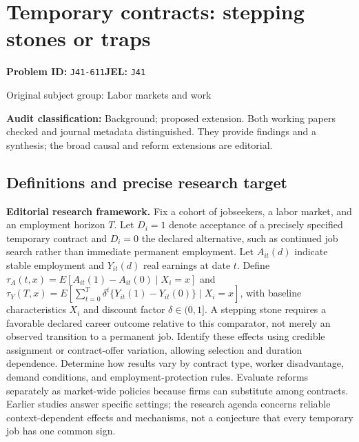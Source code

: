 \documentclass[11pt,a4paper]{article}
\begin{document}
\section*{Temporary contracts: stepping stones or traps}
\textbf{Problem ID:} \texttt{J41-611}\quad \textbf{JEL:} \texttt{J41}\par
\label{problem:OP-0359}
{\sffamily\small\color{muted}Original subject group: Labor markets and work\par}
\label{definitions:problem:30007641}
\textbf{Audit classification:} Background; proposed extension. Both working papers checked and journal metadata distinguished. They provide findings and a synthesis; the broad causal and reform extensions are editorial.
\subsection*{Definitions and precise research target}
\textbf{Editorial research framework.} Fix a cohort of jobseekers, a labor market, and an employment horizon \(T\). Let \(D_i=1\) denote acceptance of a precisely specified temporary contract and \(D_i=0\) the declared alternative, such as continued job search rather than immediate permanent employment. Let \(A_{it}(d)\) indicate stable employment and \(Y_{it}(d)\) real earnings at date \(t\). Define \(\tau_A(t,x)=E[A_{it}(1)-A_{it}(0)\mid X_i=x]\) and \(\tau_Y(T,x)=E[\sum_{t=0}^{T}\delta^t\{Y_{it}(1)-Y_{it}(0)\}\mid X_i=x]\), with baseline characteristics \(X_i\) and discount factor \(\delta\in(0,1]\). A stepping stone requires a favorable declared career outcome relative to this comparator, not merely an observed transition to a permanent job. Identify these effects using credible assignment or contract-offer variation, allowing selection and duration dependence. Determine how results vary by contract type, worker disadvantage, demand conditions, and employment-protection rules. Evaluate reforms separately as market-wide policies because firms can substitute among contracts. Earlier studies answer specific settings; the research agenda concerns reliable context-dependent effects and mechanisms, not a conjecture that every temporary job has one common sign.
\end{document}
